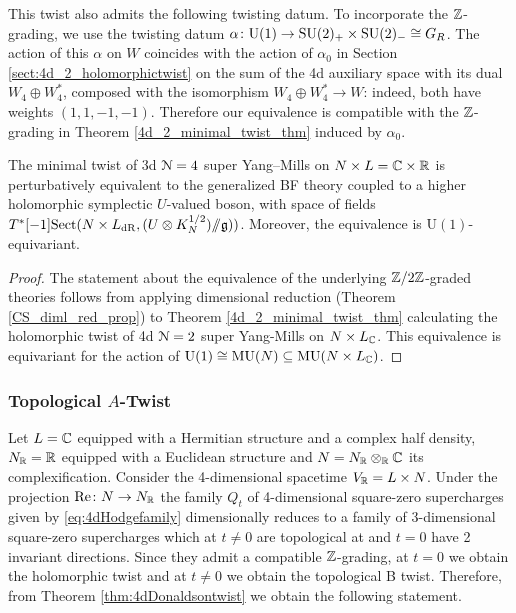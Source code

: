 \documentclass[10pt, oneside]{article}
\newcommand{\MU}{\mathrm{MU}}
\renewcommand{\Re}{\mathrm{Re}}
\renewcommand{\U}{\mathrm{U}}
\newcommand{\ham}{/\!\!/}
\begin{document}
This twist also admits the following twisting datum.
To incorporate the $\mathbb Z$-grading, we use the twisting datum $\alpha \colon \mathrm{U}(1) \to \mathrm{SU}(2)_+ \times \mathrm{SU}(2)_- \cong G_R$.  The action of this $\alpha$ on $W$ coincides with the action of $\alpha_0$ in Section \ref{sect:4d_2_holomorphictwist} on the sum of the 4d auxiliary space with its dual $W_4 \oplus W_4^*$, composed with the isomorphism $W_4 \oplus W_4^* \to W$: indeed, both have weights $(1,1,-1,-1)$.  Therefore our equivalence is compatible with the $\mathbb Z$-grading in Theorem \ref{4d_2_minimal_twist_thm} induced by $\alpha_0$.

\begin{theorem} \label{3d_4_minimal_twist_thm}
The minimal twist of 3d $\mathcal N=4$ super Yang--Mills on $N \times L=\mathbb C\times \mathbb R$ is perturbatively equivalent to the generalized BF theory coupled to a higher holomorphic symplectic $U$-valued boson, with space of fields $T^*[-1]\mr{Sect}(N \times L_{\mr{dR}}, (U \otimes K^{1/2}_N) \ham \gg))$. Moreover, the equivalence is $\U(1)$-equivariant.
\end{theorem}

\begin{proof}
The statement about the equivalence of the underlying $\mathbb Z/2\mathbb Z$-graded theories follows from applying dimensional reduction (Theorem \ref{CS_diml_red_prop}) to Theorem \ref{4d_2_minimal_twist_thm} calculating the holomorphic twist of 4d $\mathcal{N}=2$ super Yang-Mills on $N \times L_\mathbb C$.  This equivalence is equivariant for the action of $\mr U(1) \iso \MU(N) \sub \MU(N \times L_\CC)$.
\end{proof}

\subsubsection{Topological $A$-Twist}
\label{sect:3d_4_A_twist}
Let $L=\mathbb C$ equipped with a Hermitian structure and a complex half density, $N_\mathbb R=\mathbb R$ equipped with a Euclidean structure and $N=N_\mathbb R\otimes_\mathbb R\mathbb C$ its complexification. Consider the 4-dimensional spacetime $V_\mathbb R=L\times N$. Under the projection $\Re\colon N\rightarrow N_\RR$ the family $Q_t$ of 4-dimensional square-zero supercharges given by \eqref{eq:4dHodgefamily} dimensionally reduces to a family of 3-dimensional square-zero supercharges which at $t\neq 0$ are topological at and $t=0$ have 2 invariant directions. Since they admit a compatible $\mathbb Z$-grading, at $t=0$ we obtain the holomorphic twist and at $t\neq 0$ we obtain the topological B twist. Therefore, from Theorem \ref{thm:4dDonaldsontwist} we obtain the following statement.
\end{document}
